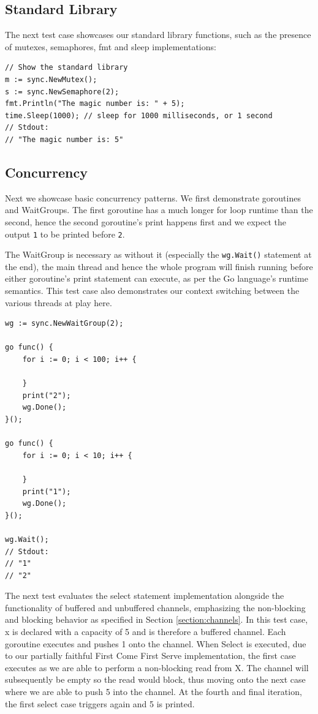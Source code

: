 \documentclass{report}
\begin{document}
\subsection{Standard Library}

The next test case showcases our standard library functions, such as the presence of mutexes, semaphores, fmt and sleep implementations:

\begin{verbatim}
// Show the standard library
m := sync.NewMutex();
s := sync.NewSemaphore(2);
fmt.Println("The magic number is: " + 5);
time.Sleep(1000); // sleep for 1000 milliseconds, or 1 second
// Stdout:
// "The magic number is: 5"
\end{verbatim}

\subsection{Concurrency}

Next we showcase basic concurrency patterns. We first demonstrate goroutines and WaitGroups. The first goroutine has a much longer for loop runtime than the second, hence the second goroutine's print happens first and we expect the output \texttt{1} to be printed before \texttt{2}.

The WaitGroup is necessary as without it (especially the \texttt{wg.Wait()} statement at the end), the main thread and hence the whole program will finish running before either goroutine's print statement can execute, as per the Go language's runtime semantics. This test case also demonstrates our context switching between the various threads at play here.

\begin{verbatim}
wg := sync.NewWaitGroup(2);

go func() {
    for i := 0; i < 100; i++ {

    }
    print("2");
    wg.Done();
}();

go func() {
    for i := 0; i < 10; i++ {

    }
    print("1");
    wg.Done();
}();

wg.Wait();
// Stdout:
// "1"
// "2"
\end{verbatim}

The next test evaluates the select statement implementation alongside the functionality of buffered and unbuffered channels, emphasizing the non-blocking and blocking behavior as specified in Section \ref{section:channels}. In this test case, x is declared with a capacity of 5 and is therefore a buffered channel. Each goroutine executes and pushes 1 onto the channel. When Select is executed, due to our partially faithful First Come First Serve implementation, the first case executes as we are able to perform a non-blocking read from X. The channel will subsequently be empty so the read would block, thus moving onto the next case where we are able to push 5 into the channel. At the fourth and final iteration, the first select case triggers again and 5 is printed.
\end{document}
